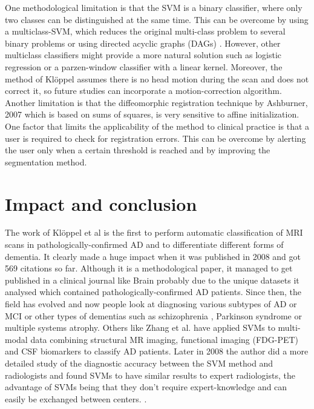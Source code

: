 \documentclass[11pt,a4paper,oneside]{report}
\begin{document}
One methodological limitation is that the SVM is a binary classifier, where only two classes can be distinguished at the same time. This can be overcome by using a multiclass-SVM, which reduces the original multi-class problem to several binary problems \cite{duan2005best} or using directed acyclic graphs (DAGs) \cite{platt1999large}. However, other multiclass classifiers might provide a more natural solution such as logistic regression \cite{desikan2009automated} or a parzen-window classifier with a linear kernel. \cite{shawe2004kernel} Moreover, the method of Kl\"{o}ppel \cite{kloppel2008automatic} assumes there is no head motion during the scan and does not correct it, so future studies can incorporate a motion-correction algorithm. Another limitation is that the diffeomorphic registration technique by Ashburner, 2007 \cite{ashburner2007fast} which is based on sums of squares, is very sensitive to affine initialization. \cite{avants2011reproducible} One factor that limits the applicability of the method to clinical practice is that a user is required to check for registration errors. This can be overcome by alerting the user only when a certain threshold is reached and by improving the segmentation method.

\section*{Impact and conclusion}

The work of Kl\"{o}ppel et al \cite{kloppel2008automatic} is the first to perform automatic classification of MRI scans in pathologically-confirmed AD and to differentiate different forms of dementia. It clearly made a huge impact when it was published in 2008 and got 569 citations so far. Although it is a methodological paper, it managed to get published in a clinical journal like Brain probably due to the unique datasets it analysed which contained pathologically-confirmed AD patients. Since then, the field has evolved and now people look at diagnosing various subtypes of AD or MCI \cite{haller2013individual} or other types of dementias such as schizophrenia \cite{ardekani2011diffusion}, Parkinson syndrome \cite{focke2011individual} or multiple systems atrophy. \cite{focke2011individual} Others like Zhang et al. \cite{zhang2011multimodal} have applied SVMs to multi-modal data combining structural MR imaging, functional imaging (FDG-PET) and CSF biomarkers to classify AD patients. Later in 2008 the author did a more detailed study of the diagnostic accuracy between the SVM method and radiologists and found SVMs to have similar results to expert radiologists, the advantage of SVMs being that they don't require expert-knowledge and can easily be exchanged between centers. \cite{kloppel2008accuracy}. 
\end{document}
